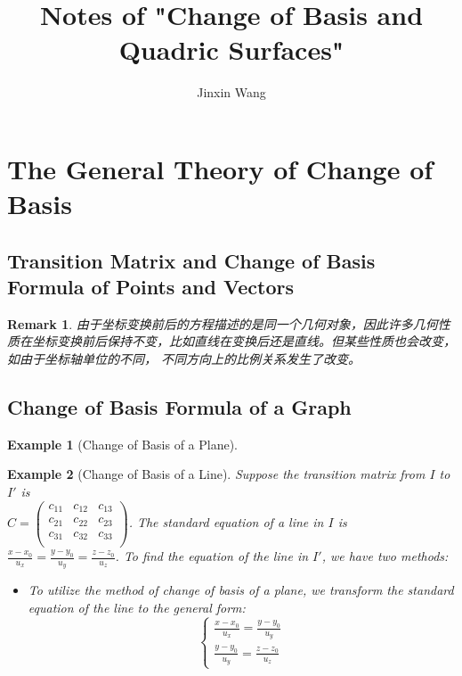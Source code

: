 \documentclass[onecolumn]{ctexart}
\title{Notes of "Change of Basis and Quadric Surfaces"}
\author{Jinxin Wang}
\date{}
\newtheorem{remark}{Remark}
\newtheorem{example}{Example}
\begin{document}
\maketitle

\section{The General Theory of Change of Basis}

\subsection{Transition Matrix and Change of Basis Formula of Points and Vectors}

\begin{remark}
  由于坐标变换前后的方程描述的是同一个几何对象，因此许多几何性质在坐标变换前后保持不变，比如直线在变换后还是直线。但某些性质也会改变，如由于坐标轴单位的不同，
  不同方向上的比例关系发生了改变。
\end{remark}

\subsection{Change of Basis Formula of a Graph}

\begin{example}[Change of Basis of a Plane]
  
\end{example}

\begin{example}[Change of Basis of a Line]
  Suppose the transition matrix from $I$ to $I'$ is \\ $C = 
  \begin{pmatrix}
    c_{11} & c_{12} & c_{13} \\
    c_{21} & c_{22} & c_{23} \\
    c_{31} & c_{32} & c_{33} \\
  \end{pmatrix}$. The standard equation of a line in $I$ is $\frac{x - x_0}{u_x} 
  = \frac{y - y_0}{u_y} = \frac{z - z_0}{u_z}$. To find the equation of the line 
  in $I'$, we have two methods:
  \begin{itemize}
    \item To utilize the method of change of basis of a plane, we transform the 
    standard equation of the line to the general form:
    \[
      \begin{cases}
        \frac{x - x_0}{u_x} = \frac{y - y_0}{u_y} \\
        \frac{y - y_0}{u_y} = \frac{z - z_0}{u_z}
      \end{cases}
    \]
  \end{itemize}
\end{example}
\end{document}
